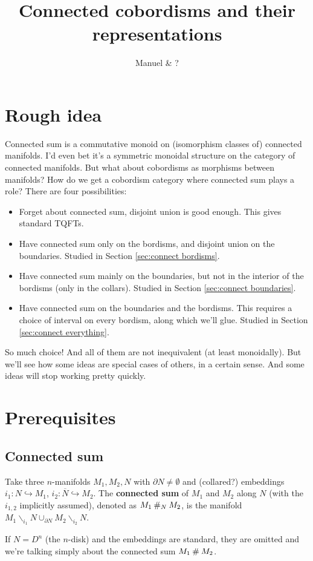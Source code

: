 \documentclass[a4paper]{article}
\title{Connected cobordisms and their representations}
\author{Manuel \& ?}
\begin{document}
\maketitle

\section{Rough idea}

Connected sum is a commutative monoid on (isomorphism classes of) connected manifolds.
I'd even bet it's a symmetric monoidal structure on the category of connected manifolds.
But what about cobordisms as morphisms between manifolds?
How do we get a cobordism category where connected sum plays a role?
There are four possibilities:
\begin{itemize}
	\item Forget about connected sum, disjoint union is good enough.
		This gives standard TQFTs.
	\item Have connected sum only on the bordisms,
		and disjoint union on the boundaries.
		Studied in Section \ref{sec:connect bordisms}.
	\item Have connected sum mainly on the boundaries,
		but not in the interior of the bordisms
		(only in the collars).
		Studied in Section \ref{sec:connect boundaries}.
	\item Have connected sum on the boundaries and the bordisms.
		This requires a choice of interval on every bordism,
		along which we'll glue.
		Studied in Section \ref{sec:connect everything}.
\end{itemize}
So much choice!
And all of them are not inequivalent (at least monoidally).
But we'll see how some ideas are special cases of others,
in a certain sense.
And some ideas will stop working pretty quickly.

\section{Prerequisites}

\subsection{Connected sum}

\begin{definition}
	\label{def:connected sum}
	Take three $n$-manifolds $M_1, M_2, N$ with $\partial N \neq \emptyset$
	and (collared?) embeddings $i_1\colon N \hookrightarrow M_1$, $i_2\colon \overline{N} \hookrightarrow M_2$.
	The \textbf{connected sum} of $M_1$ and $M_2$ along $N$ (with the $i_{1,2}$ implicitly assumed),
	denoted as $M_1 \mathbin{\#}_N M_2$,
	is the manifold $M_1 \backslash_{i_1} N \cup_{\partial N} M_2 \backslash_{i_2} N$.
	
	If $N = D^n$ (the $n$-disk) and the embeddings are standard,
	they are omitted and we're talking simply about the connected sum $M_1 \mathbin{\#} M_2$.
\end{definition}
\end{document}
